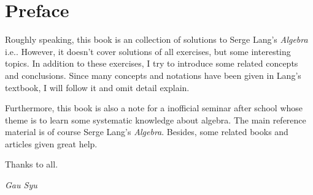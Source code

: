 \chapter{Preface}

Roughly speaking, this book is an collection of solutions to Serge Lang's \emph{Algebra} i.e.\cite{lang2002algebra}. 
However, it doesn't cover solutions of all exercises, but some interesting topics. 
In addition to these exercises, I try to introduce some related concepts and conclusions. 
Since many concepts and notations have been given in Lang's textbook, I will follow it and omit detail explain. 

Furthermore, this book is also a note for a inofficial seminar after school whose theme is to learn some systematic knowledge about algebra. 
The main reference material is of course Serge Lang's \emph{Algebra}. Besides, some related books and articles given great help.

Thanks to all.

\begin{flushright}
  \emph{Gau Syu}
\end{flushright}
